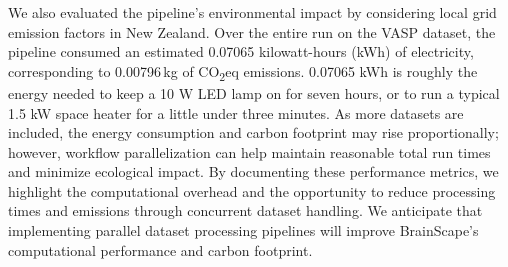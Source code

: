 We also evaluated the pipeline's environmental impact by considering local grid emission factors in New Zealand. 
Over the entire run on the VASP dataset, the pipeline consumed an estimated 0.07065 kilowatt-hours (kWh) of electricity, corresponding to 
0.00796\,kg of CO\textsubscript{2}eq emissions. 
0.07065 kWh is roughly the energy needed to keep a 10 W LED lamp on for seven hours, 
or to run a typical 1.5 kW space heater for a little under three minutes.
As more datasets are included, the energy consumption and 
carbon footprint may rise proportionally; however, workflow parallelization can help maintain 
reasonable total run times and minimize ecological impact. By documenting these performance metrics, we highlight 
the computational overhead and the opportunity to reduce processing times and emissions through concurrent dataset handling. 
We anticipate that implementing parallel dataset processing pipelines will improve BrainScape's computational performance and carbon footprint.


